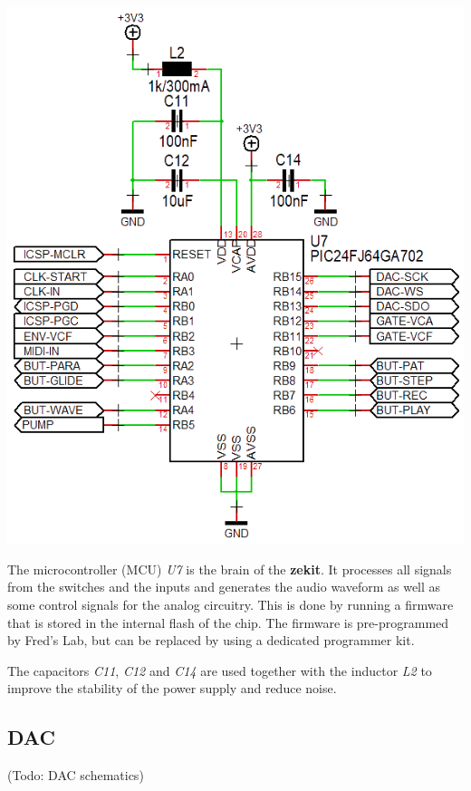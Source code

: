 \documentclass{scrartcl}
\begin{document}
\begin{center}
    \includegraphics[scale=0.55]{assets/schema-mcu.png}
\end{center}

The microcontroller (MCU) \emph{U7} is the brain of the \textbf{zekit}. It processes all signals from the switches and the inputs and generates the audio waveform as well as some control signals for the analog circuitry. This is done by running a firmware that is stored in the internal flash of the chip. The firmware is pre-programmed by Fred's Lab, but can be replaced by using a dedicated programmer kit.

The capacitors \emph{C11}, \emph{C12} and \emph{C14} are used together with the inductor \emph{L2} to improve the stability of the power supply and reduce noise.

\subsection{DAC}

\begin{center}
    (Todo: DAC schematics)
\end{center}
\end{document}
